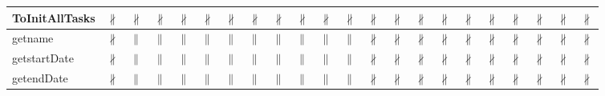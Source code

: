 \documentclass[10pt]{article}
\begin{document}
\begin{longtable}{|l|l|l|l|l|l|l|l|l|l|l|l|l|l|l|l|l|l|l|l|l|l|}
\hline
ToInitAllTasks&{\color{BrickRed}$\nparallel$}&{\color{BrickRed}$\nparallel$}&{\color{BrickRed}$\nparallel$}&{\color{BrickRed}$\nparallel$}&{\color{BrickRed}$\nparallel$}&{\color{BrickRed}$\nparallel$}&{\color{BrickRed}$\nparallel$}&{\color{BrickRed}$\nparallel$}&{\color{BrickRed}$\nparallel$}&{\color{BrickRed}$\nparallel$}&{\color{BrickRed}$\nparallel$}&{\color{BrickRed}$\nparallel$}&{\color{BrickRed}$\nparallel$}&{\color{BrickRed}$\nparallel$}&{\color{BrickRed}$\nparallel$}&{\color{BrickRed}$\nparallel$}&{\color{BrickRed}$\nparallel$}&{\color{BrickRed}$\nparallel$}&{\color{BrickRed}$\nparallel$}&{\color{BrickRed}$\nparallel$}&{\color{BrickRed}$\nparallel$}\\
\hline
getname&{\color{BrickRed}$\nparallel$}&{\color{blue}$\parallel$}&{\color{blue}$\parallel$}&{\color{blue}$\parallel$}&{\color{blue}$\parallel$}&{\color{blue}$\parallel$}&{\color{blue}$\parallel$}&{\color{blue}$\parallel$}&{\color{blue}$\parallel$}&{\color{blue}$\parallel$}&{\color{blue}$\parallel$}&{\color{BrickRed}$\nparallel$}&{\color{BrickRed}$\nparallel$}&{\color{BrickRed}$\nparallel$}&{\color{BrickRed}$\nparallel$}&{\color{BrickRed}$\nparallel$}&{\color{BrickRed}$\nparallel$}&{\color{BrickRed}$\nparallel$}&{\color{BrickRed}$\nparallel$}&{\color{BrickRed}$\nparallel$}&{\color{BrickRed}$\nparallel$}\\
\hline
getstartDate&{\color{BrickRed}$\nparallel$}&{\color{blue}$\parallel$}&{\color{blue}$\parallel$}&{\color{blue}$\parallel$}&{\color{blue}$\parallel$}&{\color{blue}$\parallel$}&{\color{blue}$\parallel$}&{\color{blue}$\parallel$}&{\color{blue}$\parallel$}&{\color{blue}$\parallel$}&{\color{blue}$\parallel$}&{\color{BrickRed}$\nparallel$}&{\color{BrickRed}$\nparallel$}&{\color{BrickRed}$\nparallel$}&{\color{BrickRed}$\nparallel$}&{\color{BrickRed}$\nparallel$}&{\color{BrickRed}$\nparallel$}&{\color{BrickRed}$\nparallel$}&{\color{BrickRed}$\nparallel$}&{\color{BrickRed}$\nparallel$}&{\color{BrickRed}$\nparallel$}\\
\hline
getendDate&{\color{BrickRed}$\nparallel$}&{\color{blue}$\parallel$}&{\color{blue}$\parallel$}&{\color{blue}$\parallel$}&{\color{blue}$\parallel$}&{\color{blue}$\parallel$}&{\color{blue}$\parallel$}&{\color{blue}$\parallel$}&{\color{blue}$\parallel$}&{\color{blue}$\parallel$}&{\color{blue}$\parallel$}&{\color{BrickRed}$\nparallel$}&{\color{BrickRed}$\nparallel$}&{\color{BrickRed}$\nparallel$}&{\color{BrickRed}$\nparallel$}&{\color{BrickRed}$\nparallel$}&{\color{BrickRed}$\nparallel$}&{\color{BrickRed}$\nparallel$}&{\color{BrickRed}$\nparallel$}&{\color{BrickRed}$\nparallel$}&{\color{BrickRed}$\nparallel$}\\

\end{longtable}
\end{document}
